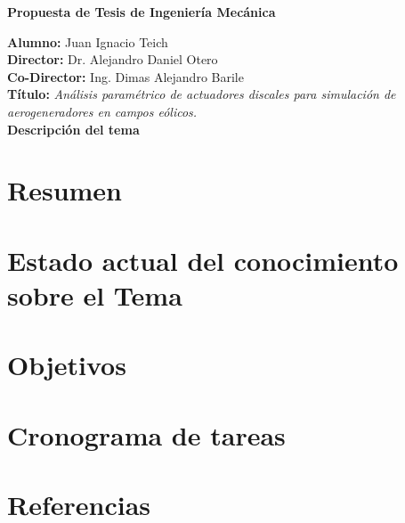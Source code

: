 \documentclass{article}
\newcommand{\thetitle}{Propuesta de Tesis de Ingeniería Mecánica}
\newcommand{\theauthorJT}{Juan Ignacio Teich}
\newcommand{\thedate}{Septiembre 2023}
\numberwithin{equation}{subsection}
\begin{document}


\begin{center}
	{\bfseries \LARGE \thetitle}
\end{center}

\noindent \textbf{Alumno:} Juan Ignacio Teich\\
\textbf{Director:} Dr. Alejandro Daniel Otero\\
\textbf{Co-Director:} Ing. Dimas Alejandro Barile\\
\textbf{Título:} \textit{Análisis paramétrico de actuadores discales para simulación de aerogeneradores en campos eólicos.}\\

\textbf{\Large Descripción del tema}
\section{Resumen}


\section{Estado actual del conocimiento sobre el Tema}


\section{Objetivos}


\section{Cronograma de tareas}


\section{Referencias}
\end{document}
